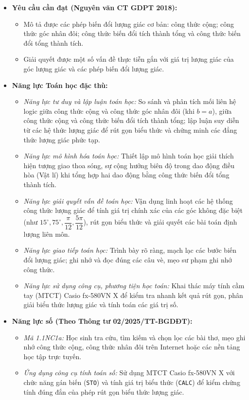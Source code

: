 \documentclass[12pt, a4paper]{article}
\begin{document}
\begin{itemize}[leftmargin=1.2cm]
    \item \textbf{Yêu cầu cần đạt (Nguyên văn CT GDPT 2018):}
    \begin{itemize}[leftmargin=0.6cm]
        \item Mô tả được các phép biến đổi lượng giác cơ bản: công thức cộng; công thức góc nhân đôi; công thức biến đổi tích thành tổng và công thức biến đổi tổng thành tích.
        \item Giải quyết được một số vấn đề thực tiễn gắn với giá trị lượng giác của góc lượng giác và các phép biến đổi lượng giác.
    \end{itemize}

    \item \textbf{Năng lực Toán học đặc thù:}
    \begin{itemize}[leftmargin=0.6cm]
        \item \textit{Năng lực tư duy và lập luận toán học:} So sánh và phân tích mối liên hệ logic giữa công thức cộng và công thức góc nhân đôi (khi $b = a$), giữa công thức cộng và công thức biến đổi tích thành tổng; lập luận suy diễn từ các hệ thức lượng giác để rút gọn biểu thức và chứng minh các đẳng thức lượng giác phức tạp.
        \item \textit{Năng lực mô hình hóa toán học:} Thiết lập mô hình toán học giải thích hiện tượng giao thoa sóng, sự cộng hưởng biên độ trong dao động điều hòa (Vật lí) khi tổng hợp hai dao động bằng công thức biến đổi tổng thành tích.
        \item \textit{Năng lực giải quyết vấn đề toán học:} Vận dụng linh hoạt các hệ thống công thức lượng giác để tính giá trị chính xác của các góc không đặc biệt (như $15^\circ, 75^\circ, \dfrac{\pi}{12}, \dfrac{5\pi}{12}$), rút gọn biểu thức và giải quyết các bài toán định lượng liên môn.
        \item \textit{Năng lực giao tiếp toán học:} Trình bày rõ ràng, mạch lạc các bước biến đổi lượng giác; ghi nhớ và đọc đúng các câu vè, mẹo sư phạm ghi nhớ công thức.
        \item \textit{Năng lực sử dụng công cụ, phương tiện học toán:} Khai thác máy tính cầm tay (MTCT) Casio fx-580VN X để kiểm tra nhanh kết quả rút gọn, phân giải biểu thức lượng giác và tính toán các giá trị số.
    \end{itemize}

    \item \textbf{Năng lực số (Theo Thông tư 02/2025/TT-BGDĐT):}
    \begin{itemize}[leftmargin=0.6cm]
        \item \textit{Mã 1.1NC1a:} Học sinh tra cứu, tìm kiếm và chọn lọc các bài thơ, mẹo ghi nhớ công thức cộng, công thức nhân đôi trên Internet hoặc các nền tảng học tập trực tuyến.
        \item \textit{Ứng dụng công cụ tính toán số:} Sử dụng MTCT Casio fx-580VN X với chức năng gán biến (\texttt{STO}) và tính giá trị biểu thức (\texttt{CALC}) để kiểm chứng tính đúng đắn của phép rút gọn biểu thức lượng giác.
    \end{itemize}


\end{itemize}
\end{document}
